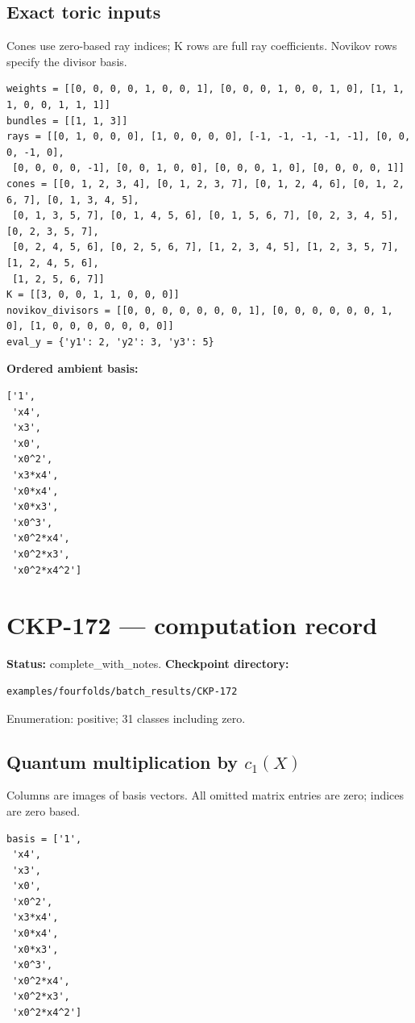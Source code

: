 \documentclass[10pt,a4paper]{article}
\begin{document}
\subsection*{Exact toric inputs}
Cones use zero-based ray indices; K rows are full ray coefficients. Novikov rows specify the divisor basis.

\begin{lstlisting}
weights = [[0, 0, 0, 0, 1, 0, 0, 1], [0, 0, 0, 1, 0, 0, 1, 0], [1, 1, 1, 0, 0, 1, 1, 1]]
bundles = [[1, 1, 3]]
rays = [[0, 1, 0, 0, 0], [1, 0, 0, 0, 0], [-1, -1, -1, -1, -1], [0, 0, 0, -1, 0],
 [0, 0, 0, 0, -1], [0, 0, 1, 0, 0], [0, 0, 0, 1, 0], [0, 0, 0, 0, 1]]
cones = [[0, 1, 2, 3, 4], [0, 1, 2, 3, 7], [0, 1, 2, 4, 6], [0, 1, 2, 6, 7], [0, 1, 3, 4, 5],
 [0, 1, 3, 5, 7], [0, 1, 4, 5, 6], [0, 1, 5, 6, 7], [0, 2, 3, 4, 5], [0, 2, 3, 5, 7],
 [0, 2, 4, 5, 6], [0, 2, 5, 6, 7], [1, 2, 3, 4, 5], [1, 2, 3, 5, 7], [1, 2, 4, 5, 6],
 [1, 2, 5, 6, 7]]
K = [[3, 0, 0, 1, 1, 0, 0, 0]]
novikov_divisors = [[0, 0, 0, 0, 0, 0, 0, 1], [0, 0, 0, 0, 0, 0, 1, 0], [1, 0, 0, 0, 0, 0, 0, 0]]
eval_y = {'y1': 2, 'y2': 3, 'y3': 5}
\end{lstlisting}

\textbf{Ordered ambient basis:}
\begin{lstlisting}
['1',
 'x4',
 'x3',
 'x0',
 'x0^2',
 'x3*x4',
 'x0*x4',
 'x0*x3',
 'x0^3',
 'x0^2*x4',
 'x0^2*x3',
 'x0^2*x4^2']
\end{lstlisting}

\clearpage\section*{CKP-172 --- computation record}
\textbf{Status:} complete\_with\_notes.
\textbf{Checkpoint directory:}
\begin{lstlisting}
examples/fourfolds/batch_results/CKP-172
\end{lstlisting}

Enumeration: positive; 31 classes including zero.
\subsection*{Quantum multiplication by $c_1(X)$}
Columns are images of basis vectors. All omitted matrix entries are zero; indices are zero based.

\begin{lstlisting}
basis = ['1',
 'x4',
 'x3',
 'x0',
 'x0^2',
 'x3*x4',
 'x0*x4',
 'x0*x3',
 'x0^3',
 'x0^2*x4',
 'x0^2*x3',
 'x0^2*x4^2']
\end{lstlisting}
\end{document}

